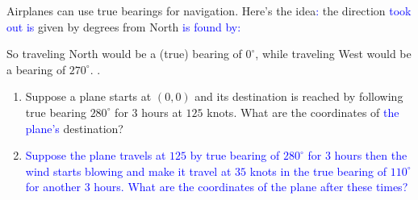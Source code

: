 \documentclass{ximera}
\begin{document}
\begin{example}[Navigation]
  Airplanes can use true bearings for navigation. Here's the idea\textcolor{blue}{:} the direction \textcolor{blue}{took out is} given by degrees from North \textcolor{blue}{is found by:}

\begin{center}
\upshape
\def\radius{2cm}
\def\onedegrad{1.8cm}
\def\fivedegrad{1.75cm}
\def\tendegrad{1.7cm}
\def\labelrad{1.6cm}

\end{center}

So traveling North would be a (true) bearing of $0^\circ$, while
traveling West would be a bearing of $270^\circ$.
.
\begin{enumerate}
\item Suppose a plane starts at $(0,0)$ and its destination is reached
  by following true bearing $280^\circ$ for $3$ hours at $125$ knots.
  What are the coordinates of \textcolor{blue}{the plane's} destination?
\item \textcolor{blue}{Suppose the plane travels at $125$ by true bearing of $280^\circ$ for $3$ hours then the wind starts blowing and make it travel at $35$ knots in the true
  bearing of $110^\circ$ for another $3$ hours. What are the coordinates of
  the plane after these times?}
\end{enumerate}


\end{example}
\end{document}
